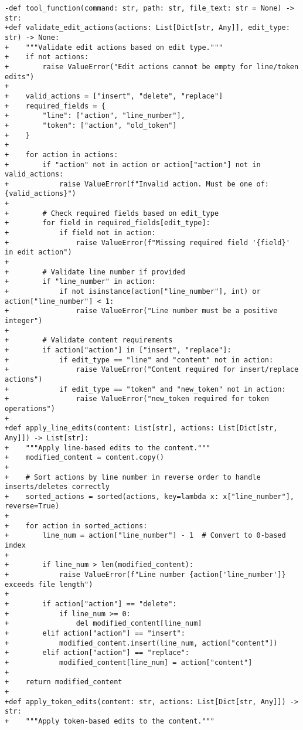 \begin{lstlisting}[style=diffstyle]
-def tool_function(command: str, path: str, file_text: str = None) -> str:
+def validate_edit_actions(actions: List[Dict[str, Any]], edit_type: str) -> None:
+    """Validate edit actions based on edit type."""
+    if not actions:
+        raise ValueError("Edit actions cannot be empty for line/token edits")
+
+    valid_actions = ["insert", "delete", "replace"]
+    required_fields = {
+        "line": ["action", "line_number"],
+        "token": ["action", "old_token"]
+    }
+
+    for action in actions:
+        if "action" not in action or action["action"] not in valid_actions:
+            raise ValueError(f"Invalid action. Must be one of: {valid_actions}")
+
+        # Check required fields based on edit_type
+        for field in required_fields[edit_type]:
+            if field not in action:
+                raise ValueError(f"Missing required field '{field}' in edit action")
+
+        # Validate line number if provided
+        if "line_number" in action:
+            if not isinstance(action["line_number"], int) or action["line_number"] < 1:
+                raise ValueError("Line number must be a positive integer")
+
+        # Validate content requirements
+        if action["action"] in ["insert", "replace"]:
+            if edit_type == "line" and "content" not in action:
+                raise ValueError("Content required for insert/replace actions")
+            if edit_type == "token" and "new_token" not in action:
+                raise ValueError("new_token required for token operations")
+
+def apply_line_edits(content: List[str], actions: List[Dict[str, Any]]) -> List[str]:
+    """Apply line-based edits to the content."""
+    modified_content = content.copy()
+    
+    # Sort actions by line number in reverse order to handle inserts/deletes correctly
+    sorted_actions = sorted(actions, key=lambda x: x["line_number"], reverse=True)
+
+    for action in sorted_actions:
+        line_num = action["line_number"] - 1  # Convert to 0-based index
+        
+        if line_num > len(modified_content):
+            raise ValueError(f"Line number {action['line_number']} exceeds file length")
+
+        if action["action"] == "delete":
+            if line_num >= 0:
+                del modified_content[line_num]
+        elif action["action"] == "insert":
+            modified_content.insert(line_num, action["content"])
+        elif action["action"] == "replace":
+            modified_content[line_num] = action["content"]
+
+    return modified_content
+
+def apply_token_edits(content: str, actions: List[Dict[str, Any]]) -> str:
+    """Apply token-based edits to the content."""

\end{lstlisting}

